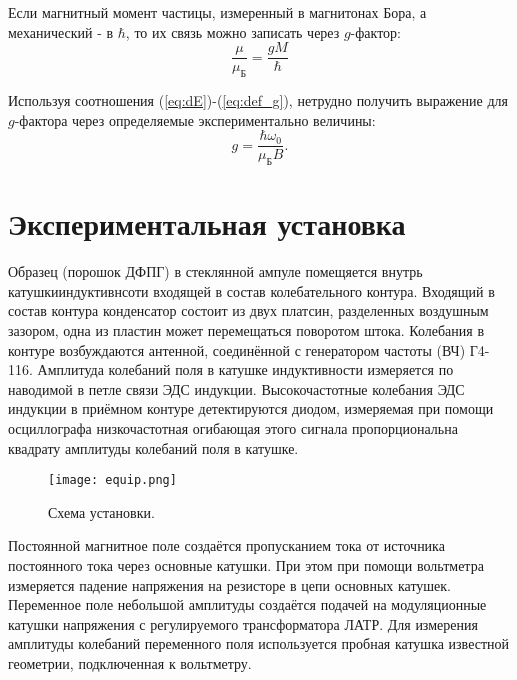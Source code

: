         Если магнитный момент частицы, измеренный в магнитонах Бора, а механический - в $\hbar$, то их связь можно записать через $g$-фактор:
        \begin{equation}
            \label{eq:def_g}
            \frac{\mu}{\mu_\text{Б}} = \frac{g M}{\hbar} 
        \end{equation}

        Используя соотношения (\ref{eq:dE})-(\ref{eq:def_g}), нетрудно получить выражение для $g$-фактора через определяемые экспериментально величины:
        \begin{equation}
            \label{eq:g_is}
            \tag{$\star$}
            g = \frac{\hbar \omega_0}{\mu_\text{Б} B}.
        \end{equation}

    \newpage
    
    \section{Экспериментальная установка}
    
    Образец (порошок ДФПГ) в стеклянной ампуле помещяется внутрь катушкииндуктивнсоти входящей в состав колебательного контура. Входящий в состав контура конденсатор состоит из двух платсин, разделенных воздушным зазором, одна из пластин может перемещаться поворотом штока. Колебания в контуре возбуждаются антенной, соединённой с генератором частоты (ВЧ) Г4-116. Амплитуда колебаний поля в катушке индуктивности измеряется по наводимой в петле связи ЭДС индукции. Высокочастотные колебания ЭДС индукции в приёмном контуре детектируются диодом, измеряемая при помощи осциллографа низкочастотная огибающая этого сигнала пропорциональна квадрату амплитуды колебаний поля в катушке.
    \begin{figure}[h!]
        \centering
            \caption{Схема установки.}
            \label{fig:equip}
            \texttt{[image: equip.png]}
    \end{figure}
    
    Постоянной магнитное поле создаётся пропусканием тока от источника постоянного тока через основные катушки. При этом при помощи вольтметра измеряется падение напряжения на резисторе в цепи основных катушек. Переменное поле небольшой амплитуды создаётся подачей на модуляционные катушки напряжения с регулируемого трансформатора ЛАТР. Для измерения амплитуды колебаний переменного поля используется пробная катушка известной геометрии, подключенная к вольтметру.


